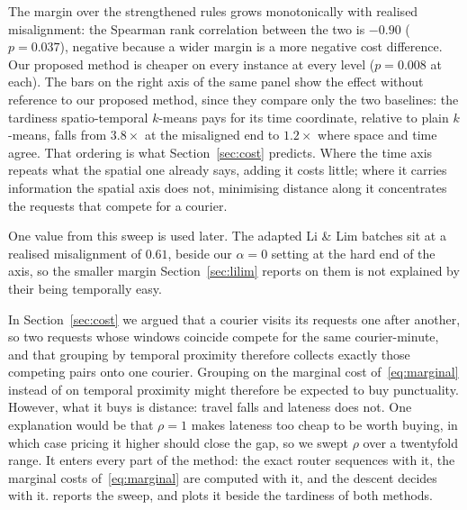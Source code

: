 The margin over the strengthened rules grows monotonically with realised
misalignment: the Spearman rank correlation between the two is
$-0.90$ ($p=0.037$), negative because a wider margin
is a more negative cost difference. Our proposed method is cheaper on every
instance at every level ($p=0.008$ at each). The bars on the right axis of the same panel
show the effect without reference to our proposed method, since they compare
only the
two baselines: the tardiness spatio-temporal $k$-means pays for its time
coordinate, relative to plain $k$-means, falls from $3.8\times$ at the
misaligned end to $1.2\times$ where space and time agree. That
ordering is what Section~\ref{sec:cost} predicts. Where the time axis repeats
what the spatial one already says, adding it costs little; where it carries
information the spatial axis does not, minimising distance along it concentrates
the requests that compete for a courier.

One value from this sweep is used later. The adapted Li \& Lim batches sit at a
realised misalignment of $0.61$, beside our $\alpha=0$ setting at the hard end
of the axis, so the smaller margin Section~\ref{sec:lilim} reports on them is
not explained by their being temporally easy.

\label{sec:rho}
In Section~\ref{sec:cost} we argued that a courier visits its requests one after
another, so two requests whose windows coincide compete for the same
courier-minute, and that grouping by temporal proximity therefore collects
exactly those competing pairs onto one courier. Grouping on the marginal cost
of~\eqref{eq:marginal} instead of on temporal proximity might therefore be
expected to buy punctuality. However, what it buys is distance: travel falls and
lateness does not. One explanation would be
that $\rho=1$ makes lateness too cheap to be worth buying, in which case pricing
it higher should close the gap, so we swept $\rho$ over a twentyfold range. It enters every part of the
method: the exact router sequences with it, the marginal costs
of~\eqref{eq:marginal} are computed with it, and the descent decides with it.
 reports the sweep, and
 plots it beside the tardiness of both methods.

